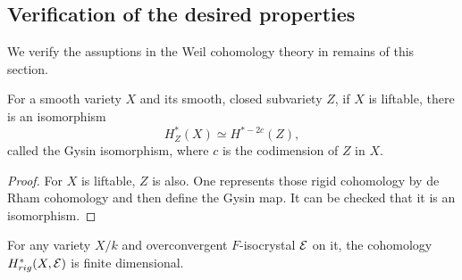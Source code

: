 \subsection{Verification of the desired properties}
We verify the assuptions in the Weil cohomology theory in remains of this section. 
\begin{proposition}
    For a smooth variety $X$ and its smooth, closed subvariety $Z$, 
    if $X$ is liftable, there is an isomorphism
    \[
        H^*_Z(X) \simeq H^{*-2c}(Z),
    \]
    called the Gysin isomorphism, where $c$ is the codimension of $Z$ in $X$.
\end{proposition}

\begin{proof}
    For $X$ is liftable, $Z$ is also. 
    One represents those rigid cohomology by de Rham cohomology 
    and then define the Gysin map. 
    It can be checked that it is an isomorphism.
\end{proof}

\begin{theorem}
    For any variety $X / k$ and overconvergent $F$-isocrystal ${\mathcal {E}}$ on it, 
    the cohomology $H^*_{rig}(X, {\mathcal {E}})$ is finite dimensional.
\end{theorem}

